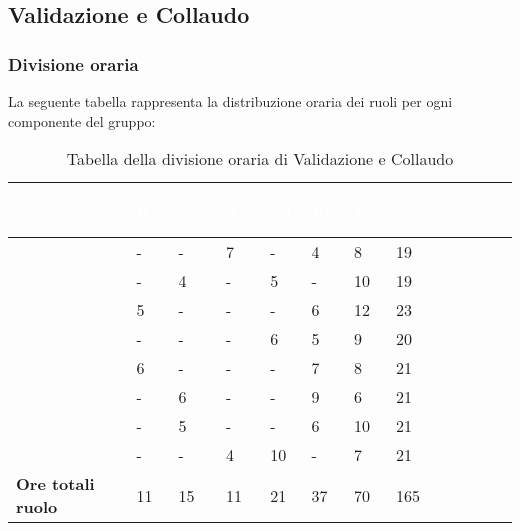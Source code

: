 \subsection{Validazione e Collaudo}

\subsubsection{Divisione oraria}
La seguente tabella rappresenta la distribuzione oraria dei ruoli per ogni componente del gruppo:
{
\renewcommand{\arraystretch}{2}
\begin{longtable}[h!] { C{4cm} C{1cm} C{1cm} C{1cm} C{1cm} C{1cm} C{1cm} C{3cm}}
\caption{Tabella della divisione oraria di Validazione e Collaudo}\\

\textcolor{white}{\textbf{Membro del gruppo}} & 
\textcolor{white}{\textbf{RE}} & 
\textcolor{white}{\textbf{AM}} & 
\textcolor{white}{\textbf{AN}} & 
\textcolor{white}{\textbf{PT}} & 
\textcolor{white}{\textbf{PR}} &
\textcolor{white}{\textbf{VE}} &
\textcolor{white}{\textbf{Ore complessive}}\\	
\endhead
        
\MC{}                     &  - &  - &  7 &  - &  4 &  8 &  19 \\
\LD{}                     &  - &  4 &  - &  5 &  - & 10 &  19 \\
\CE{}                     &  5 &  - &  - &  - &  6 & 12 &  23 \\ 
\SE{}                     &  - &  - &  - &  6 &  5 &  9 &  20 \\
\PF{}                     &  6 &  - &  - &  - &  7 &  8 &  21 \\
\DF{}                     &  - &  6 &  - &  - &  9 &  6 &  21 \\
\BR{}                     &  - &  5 &  - &  - &  6 & 10 &  21 \\
\AT{}                     &  - &  - &  4 & 10 &  - &  7 &  21 \\
\textbf{Ore totali ruolo} & 11 & 15 & 11 & 21 & 37 & 70 & 165 \\
		
\end{longtable}
}



